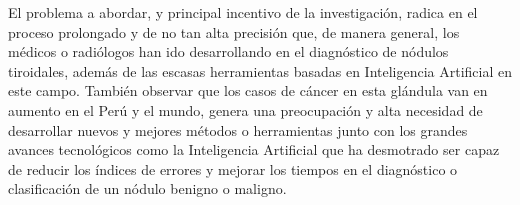 El problema a abordar, y principal incentivo de la investigación, radica en el proceso prolongado y de no tan alta precisión que, de manera general, los médicos o radiólogos han ido desarrollando en el diagnóstico de nódulos tiroidales, además de las escasas herramientas basadas en Inteligencia Artificial en este campo. También observar que los casos de cáncer en esta glándula van en aumento en el Perú y el mundo, genera una preocupación y alta necesidad de desarrollar nuevos y mejores métodos o herramientas junto con los grandes avances tecnológicos como la Inteligencia Artificial que ha desmotrado ser capaz de reducir los índices de errores y mejorar los tiempos en el diagnóstico o clasificación de un nódulo benigno o maligno.
